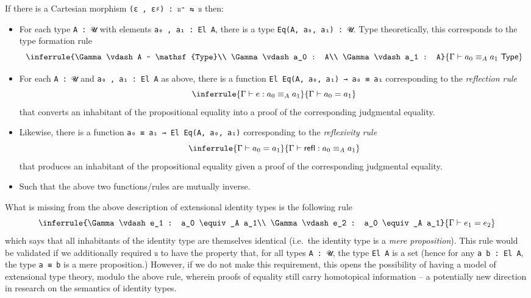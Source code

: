 \documentclass[
  11pt,
  oneside,
  article]{memoir}
\providecommand{\tightlist}{%
  \setlength{\itemsep}{0pt}\setlength{\parskip}{0pt}}
\theoremstyle{definition}
\theoremstyle{plain}
\newcommand{\0}{\textsf{0}}
\newcommand{\1}{\tn{\textsf{1}}}
\begin{document}
If there is a Cartesian morphism \texttt{(ε\ ,\ ε♯)\ :\ 𝔲⁼\ ⇆\ 𝔲} then:

\begin{itemize}
\tightlist
\item
  For each type \texttt{A\ :\ 𝓤} with elements
  \texttt{a₀\ ,\ a₁\ :\ El\ A}, there is a type
  \texttt{Eq(A,\ a₀,\ a₁)\ :\ 𝓤}. Type theoretically, this corresponds
  to the type formation rule \[
  \inferrule{\Gamma \vdash A ~ \mathsf{Type}\\ \Gamma \vdash a_0 : A\\ \Gamma \vdash a_1 : A}{\Gamma \vdash a_0 \equiv_A a_1 ~ \mathsf{Type}}
  \]
\item
  For each \texttt{A\ :\ 𝓤} and \texttt{a₀\ ,\ a₁\ :\ El\ A} as above,
  there is a function \texttt{El\ Eq(A,\ a₀,\ a₁)\ →\ a₀\ ≡\ a₁}
  corresponding to the \emph{reflection rule} \[
  \inferrule{\Gamma \vdash e : a_0 \equiv_A a_1}{\Gamma \vdash a_0 = a_1}
  \] that converts an inhabitant of the propositional equality into a
  proof of the corresponding judgmental equality.
\item
  Likewise, there is a function
  \texttt{a₀\ ≡\ a₁\ →\ El\ Eq(A,\ a₀,\ a₁)} corresponding to the
  \emph{reflexivity rule} \[
  \inferrule{\Gamma \vdash a_0 = a_1}{\Gamma \vdash \mathsf{refl} : a_0 \equiv_A a_1}
  \] that produces an inhabitant of the propositional equality given a
  proof of the corresponding judgmental equality.
\item
  Such that the above two functions/rules are mutually inverse.
\end{itemize}

What is missing from the above description of extensional identity types
is the following rule \[
\inferrule{\Gamma \vdash e_1 : a_0 \equiv_A a_1\\ \Gamma \vdash e_2 : a_0 \equiv_A a_1}{\Gamma \vdash e_1 = e_2}
\] which says that all inhabitants of the identity type are themselves
identical (i.e.~the identity type is a \emph{mere proposition}). This
rule would be validated if we additionally required \texttt{𝔲} to have
the property that, for all types \texttt{A\ :\ 𝓤}, the type
\texttt{El\ A} is a set (hence for any \texttt{a\ b\ :\ El\ A}, the type
\texttt{a\ ≡\ b} is a mere proposition.) However, if we do not make this
requirement, this opens the possibility of having a model of extensional
type theory, modulo the above rule, wherein proofs of equality still
carry homotopical information -- a potentially new direction in research
on the semantics of identity types.
\end{document}
